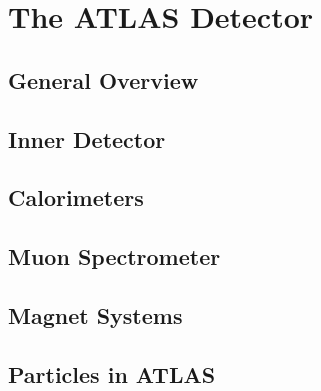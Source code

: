 \chapter{The ATLAS Detector}

\section{General Overview}
\section{Inner Detector}
\section{Calorimeters}
\section{Muon Spectrometer}
\section{Magnet Systems}
\section{Particles in ATLAS}

